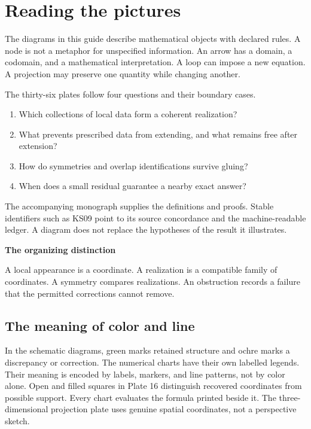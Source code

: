 \documentclass[11pt]{article}
\begin{document}
\KomorebiCover
\section*{Reading the pictures}
The diagrams in this guide describe mathematical objects with declared rules. A node is not a metaphor for unspecified information. An arrow has a domain, a codomain, and a mathematical interpretation. A loop can impose a new equation. A projection may preserve one quantity while changing another.

The thirty-six plates follow four questions and their boundary cases.
\begin{enumerate}
\item Which collections of local data form a coherent realization?
\item What prevents prescribed data from extending, and what remains free after extension?
\item How do symmetries and overlap identifications survive gluing?
\item When does a small residual guarantee a nearby exact answer?
\end{enumerate}

The accompanying monograph supplies the definitions and proofs. Stable identifiers such as KS09 point to its source concordance and the machine-readable ledger. A diagram does not replace the hypotheses of the result it illustrates.

\begin{insight}
\textbf{The organizing distinction}\par
A local appearance is a coordinate. A realization is a compatible family of coordinates. A symmetry compares realizations. An obstruction records a failure that the permitted corrections cannot remove.
\end{insight}

\subsection*{The meaning of color and line}
In the schematic diagrams, green marks retained structure and ochre marks a discrepancy or correction. The numerical charts have their own labelled legends. Their meaning is encoded by labels, markers, and line patterns, not by color alone. Open and filled squares in Plate 16 distinguish recovered coordinates from possible support. Every chart evaluates the formula printed beside it. The three-dimensional projection plate uses genuine spatial coordinates, not a perspective sketch.
\end{document}
